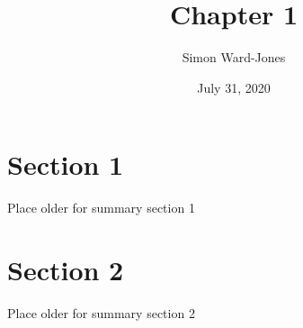 \documentclass[12pt,notitlepage]{article}
\begin{document}


\title{\Large{\textbf{Chapter 1}}}
\date{July 31, 2020}
\author{Simon Ward-Jones}

\maketitle

\section{Section 1}
Place older for summary section 1

\section{Section 2}
Place older for summary section 2

\vfill

\nocite{LeCun2015}
\nocite{zhang2020dive}
\end{document}
